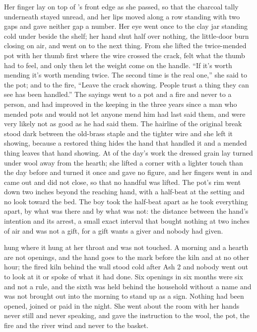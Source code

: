 Her finger lay on top of 's front edge as she passed, so that the charcoal tally underneath stayed unread, and her lips moved along a row standing with two gaps and gave neither gap a number. Her eye went once to the clay jar standing cold under  beside the shelf; her hand shut half over nothing, the little-door burn closing on air, and went on to the next thing. From  she lifted the twice-mended pot with her thumb first where the wire crossed the crack, felt what the thumb had to feel, and only then let the weight come on the handle. “If it's worth mending it's worth mending twice. The second time is the real one,” she said to the pot; and to the fire, “Leave the crack showing. People trust a thing they can see has been handled.” The sayings went to a pot and a fire and never to a person, and had improved in the keeping in the three years since a man who mended pots and would not let anyone mend him had last said them, and were very likely not as good as he had said them. The hairline of the original break stood dark between the old-brass staple and the tighter wire and she left it showing, because a restored thing hides the hand that handled it and a mended thing leaves that hand showing. At  of the day's work the dressed grain lay turned under wool away from the hearth; she lifted a corner with a lighter touch than the day before and turned it once and gave no figure, and her fingers went in and came out and did not close, so that no handful was lifted. The pot's rim went down two inches beyond the reaching hand, with a half-beat at the setting and no look toward the bed. The boy took the half-beat apart as he took everything apart, by what was there and by what was not: the distance between the hand's intention and its arrest, a small exact interval that bought nothing at two inches of air and was not a gift, for a gift wants a giver and nobody had given.

\scenebreak

 hung where it hung at her throat and was not touched. A morning and a hearth are not openings, and the hand goes to the mark before the kiln and at no other hour; the fired kiln behind the wall stood cold after Ash 2 and nobody went out to look at it or spoke of what it had done. Six openings in six months were six and not a rule, and the sixth was held behind the household without a name and was not brought out into the morning to stand up as a sign. Nothing had been opened, joined or paid in the night. She went about the room with her hands never still and never speaking, and gave the instruction to the wool, the pot, the fire and the river wind and never to the basket.

